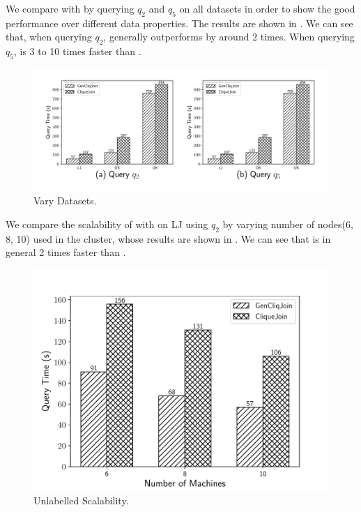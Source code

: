  We compare \gencliqjoin with \cliquejoin by querying $q_2$ and $q_5$ on all datasets in order to show the good performance over different data properties. The results are shown in . We can see that, when querying $q_2$, \gencliqjoin generally outperforms \cliquejoin by around 2 times. When querying $q_5$, \gencliqjoin is 3 to 10 times faster than \cliquejoin. 

\begin{figure}[htb]
  \flushleft
  \includegraphics[scale=0.3]{figures/exp2.pdf}
  \caption{\small{Vary Datasets.}}
  \label{fig:vary_dataset}
\end{figure}


 We compare the scalability of \gencliqjoin with \cliquejoin on LJ using $q_2$ by varying number of nodes(6, 8, 10) used in the cluster, whose results are shown in . We can see that \gencliqjoin is in general 2 times faster than \cliquejoin.

\begin{figure}[htb]
  \centering
  \includegraphics[scale=0.37]{figures/exp3.pdf}
  \caption{\small{Unlabelled Scalability.}}
  \label{fig:unl_sca}
\end{figure}


